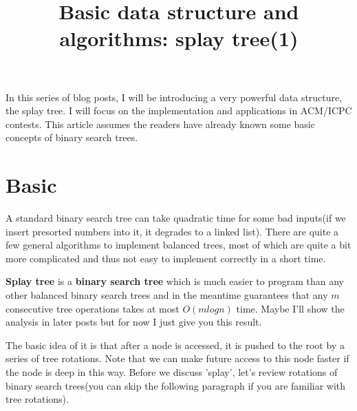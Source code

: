 \documentclass[a4paper,11pt]{article}
\title{Basic data structure and algorithms: splay tree(1)}
\begin{document}
\maketitle
In this series of blog posts, I will be introducing a very powerful data structure, the splay tree. I will focus on the implementation and applications in ACM/ICPC contests.
This article assumes the readers have already known some basic concepts of binary search trees.
\section*{Basic}
A standard binary search tree can take quadratic time for some bad inputs(if we insert presorted numbers into it, it degrades to a linked list). There are quite a few general algorithms to implement balanced trees, most of which are quite a bit more complicated and thus not easy to implement correctly in a short time.

\textbf{Splay tree} is a \textbf{binary search tree} which is much easier to program than any other balanced binary search trees and in the meantime guarantees that any $m$ consecutive tree operations takes at most $O(m log n)$ time. Maybe I'll show the analysis in later posts but for now I just give you this result.

The basic idea of it is that after a node is accessed, it is pushed to the root by a series of tree rotations. Note that we can make future access to this node faster if the node is deep in this way. Before we discuss 'splay', let's review rotations of binary search trees(you can skip the following paragraph if you are familiar with tree rotations).
\end{document}
